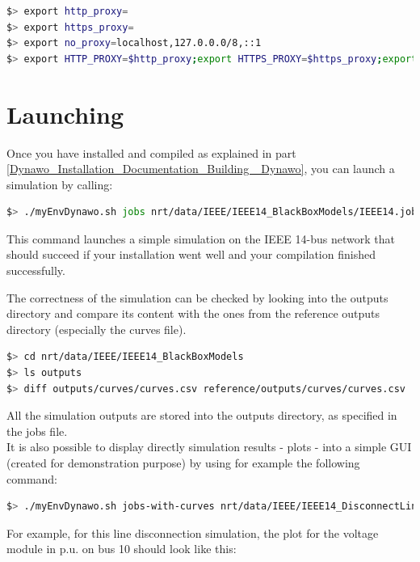 \documentclass[a4paper, 12pt]{report}
\begin{document}
\begin{lstlisting}[language=bash]
$> export http_proxy=
$> export https_proxy=
$> export no_proxy=localhost,127.0.0.0/8,::1
$> export HTTP_PROXY=$http_proxy;export HTTPS_PROXY=$https_proxy;export NO_PROXY=$no_proxy;
\end{lstlisting}

\section{Launching \Dynawo}

Once you have installed and compiled \Dynawo as explained in part \ref{Dynawo_Installation_Documentation_Building _Dynawo}, you can launch a simulation by calling:

\begin{lstlisting}[language=bash]
$> ./myEnvDynawo.sh jobs nrt/data/IEEE/IEEE14_BlackBoxModels/IEEE14.jobs
\end{lstlisting}

This command launches a simple simulation on the IEEE 14-bus network that should succeed if your installation went well and your compilation finished successfully.

The correctness of the simulation can be checked by looking into the outputs directory and compare its content with the ones from the reference outputs directory (especially the curves file).

\begin{lstlisting}[language=bash]
$> cd nrt/data/IEEE/IEEE14_BlackBoxModels
$> ls outputs
$> diff outputs/curves/curves.csv reference/outputs/curves/curves.csv
\end{lstlisting}

All the simulation outputs are stored into the outputs directory, as specified in the jobs file. \\

It is also possible to display directly simulation results - plots - into a simple GUI (created for demonstration purpose) by using for example the following command:

\begin{lstlisting}[language=bash]
$> ./myEnvDynawo.sh jobs-with-curves nrt/data/IEEE/IEEE14_DisconnectLine/IEEE14.jobs
\end{lstlisting}

For example, for this line disconnection simulation, the plot for the voltage module in p.u. on bus 10 should look like this:
\end{document}
